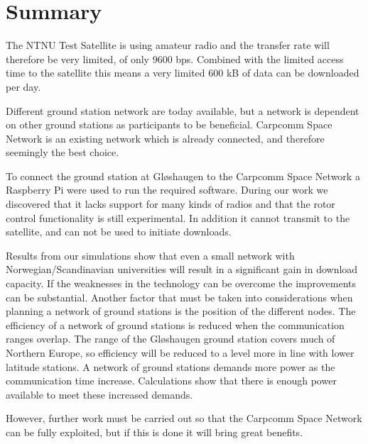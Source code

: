 \section{Summary}
The NTNU Test Satellite is using amateur radio and the transfer rate will therefore be very limited, of only 9600 bps. Combined with the limited access time to the satellite this means a very limited 600 kB of data can be downloaded per day. 

Different ground station network are today available, but a network is dependent on other ground stations as participants to be beneficial. Carpcomm Space Network is an existing network which is already connected, and therefore seemingly the best choice. 

To connect the ground station at Gløshaugen to the Carpcomm Space Network a Raspberry Pi were used to run the required software. During our work we discovered that it lacks support for many kinds of radios and that the rotor control functionality is still experimental. In addition it cannot transmit to the satellite, and can not be used to initiate downloads. 

Results from our simulations show that even a small network with Norwegian/Scandinavian universities will result in a significant gain in download capacity. If the weaknesses in the technology can be overcome the improvements can be substantial. Another factor that must be taken into considerations when planning a network of ground stations is the position of the different nodes. The efficiency of a network of ground stations is reduced when the communication ranges overlap. The range of the Gløshaugen ground station covers much of Northern Europe, so efficiency will be reduced to a level more in line with lower latitude stations. A network of ground stations demands more power as the communication time increase. Calculations show that there is enough power available to meet these increased demands.

However, further work must be carried out so that the Carpcomm Space Network can be fully exploited, but if this is done it will bring great benefits.


